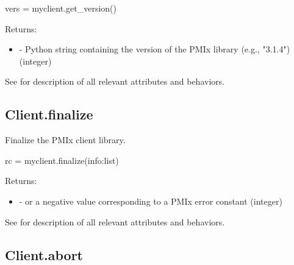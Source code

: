 \pyspecificstart
\begin{codepar}
vers = myclient.get_version()
\end{codepar}
\pyspecificend

Returns:

\begin{itemize}
    \item {} - Python string containing the version of the \ac{PMIx} library (e.g., "3.1.4") (integer)

\end{itemize}

See  for description of all relevant attributes and behaviors.


\subsection{Client.finalize}

\summary

Finalize the PMIx client library.

\format

\pyspecificstart
\begin{codepar}
rc = myclient.finalize(info:list)
\end{codepar}
\pyspecificend

\begin{arglist}
\end{arglist}

Returns:

\begin{itemize}
    \item {} -  or a negative value corresponding to a PMIx error constant (integer)
\end{itemize}

See  for description of all relevant attributes and behaviors.


\subsection{Client.abort}

\summary

